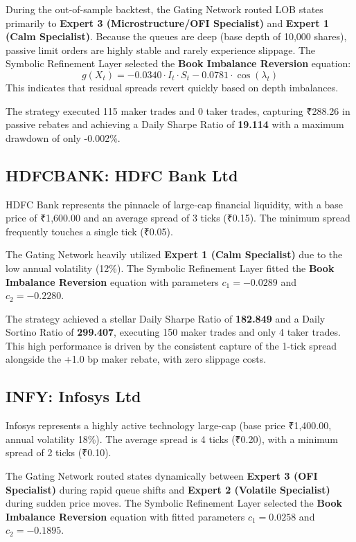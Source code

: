 \documentclass[11pt,a4paper]{article}
\begin{document}
During the out-of-sample backtest, the Gating Network routed LOB states primarily to \textbf{Expert 3 (Microstructure/OFI Specialist)} and \textbf{Expert 1 (Calm Specialist)}. Because the queues are deep (base depth of 10,000 shares), passive limit orders are highly stable and rarely experience slippage. The Symbolic Refinement Layer selected the \textbf{Book Imbalance Reversion} equation:
\begin{equation}
    g(X_t) = -0.0340 \cdot I_t \cdot S_t - 0.0781 \cdot \cos(\lambda_t)
\end{equation}
This indicates that residual spreads revert quickly based on depth imbalances. 

The strategy executed 115 maker trades and 0 taker trades, capturing ₹288.26 in passive rebates and achieving a Daily Sharpe Ratio of \textbf{19.114} with a maximum drawdown of only -0.002\%.

\subsection{HDFCBANK: HDFC Bank Ltd}
HDFC Bank represents the pinnacle of large-cap financial liquidity, with a base price of ₹1,600.00 and an average spread of 3 ticks (₹0.15). The minimum spread frequently touches a single tick (₹0.05).

The Gating Network heavily utilized \textbf{Expert 1 (Calm Specialist)} due to the low annual volatility (12\%). The Symbolic Refinement Layer fitted the \textbf{Book Imbalance Reversion} equation with parameters $c_1 = -0.0289$ and $c_2 = -0.2280$. 

The strategy achieved a stellar Daily Sharpe Ratio of \textbf{182.849} and a Daily Sortino Ratio of \textbf{299.407}, executing 150 maker trades and only 4 taker trades. This high performance is driven by the consistent capture of the 1-tick spread alongside the +1.0 bp maker rebate, with zero slippage costs.

\subsection{INFY: Infosys Ltd}
Infosys represents a highly active technology large-cap (base price ₹1,400.00, annual volatility 18\%). The average spread is 4 ticks (₹0.20), with a minimum spread of 2 ticks (₹0.10).

The Gating Network routed states dynamically between \textbf{Expert 3 (OFI Specialist)} during rapid queue shifts and \textbf{Expert 2 (Volatile Specialist)} during sudden price moves. The Symbolic Refinement Layer selected the \textbf{Book Imbalance Reversion} equation with fitted parameters $c_1 = 0.0258$ and $c_2 = -0.1895$.
\end{document}
